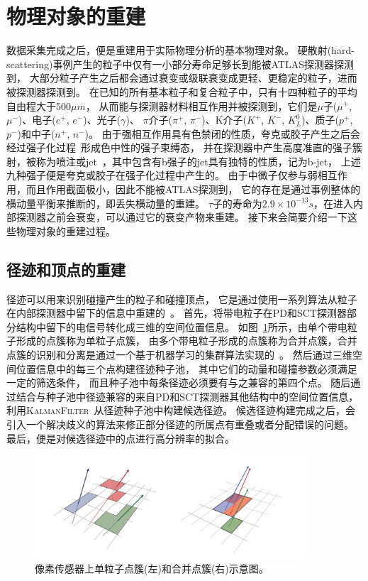 \section{物理对象的重建}
\label{sec:Reconstruction}

数据采集完成之后，便是重建用于实际物理分析的基本物理对象。
硬散射(hard-scattering)事例产生的粒子中仅有一小部分寿命足够长到能被ATLAS探测器探测到，
大部分粒子产生之后都会通过衰变或级联衰变成更轻、更稳定的粒子，进而被探测器探测到。
在已知的所有基本粒子和复合粒子中，只有十四种粒子的平均自由程大于500$\mu m$，
从而能与探测器材料相互作用并被探测到，它们是$\mu$子($\mu^+$, $\mu^-$)、电子($e^+$, $e^-$)、光子($\gamma$)、
$\pi$介子($\pi^+$, $\pi^-$)、K介子($K^+$, $K^-$, $K_L^0$)、质子($p^+$, $p^-$)和中子($n^+$, $n^-$)。
由于强相互作用具有色禁闭的性质，夸克或胶子产生之后会经过强子化过程~\cite{Hadonization}形成色中性的强子束缚态，
并在探测器中产生高度准直的强子簇射，被称为喷注或jet~\cite{JETS}，其中包含有b强子的jet具有独特的性质，记为b-jet，
上述九种强子便是夸克或胶子在强子化过程中产生的。
由于中微子仅参与弱相互作用，而且作用截面极小，因此不能被ATLAS探测到，
它的存在是通过事例整体的横动量平衡来推断的，即丢失横动量的重建。
$\tau$子的寿命为$2.9×10^{−13}s$，在进入内部探测器之前会衰变，可以通过它的衰变产物来重建。
接下来会简要介绍一下这些物理对象的重建过程。


\subsection{径迹和顶点的重建}
\label{sec:TRACKS}

径迹可以用来识别碰撞产生的粒子和碰撞顶点，
它是通过使用一系列算法从粒子在内部探测器中留下的信息中重建的~\cite{TRACK1}。
首先，将带电粒子在PD和SCT探测器部分结构中留下的电信号转化成三维的空间位置信息。
如图~\ref{fig:ATLASORT1}所示，由单个带电粒子形成的点簇称为单粒子点簇，
由多个带电粒子形成的点簇称为合并点簇，合并点簇的识别和分离是通过一个基于机器学习的集群算法实现的~\cite{NNCLUSTER}。
然后通过三维空间位置信息中的每三个点构建径迹种子池，
其中它们的动量和碰撞参数必须满足一定的筛选条件，
而且种子池中每条径迹必须要有与之兼容的第四个点。
随后通过结合与种子池中径迹兼容的来自PD和SCT探测器其他结构中的空间位置信息，
利用\textsc{KalmanFilter}~\cite{KALMAN}从径迹种子池中构建候选径迹。
候选径迹构建完成之后，会引入一个解决歧义的算法来修正部分径迹的所属点有重叠或者分配错误的问题。
最后，便是对候选径迹中的点进行高分辨率的拟合。

\begin{figure}
  \begin{center}
    \includegraphics[width=0.9\textwidth]{figuresEXP/ATLASORT1.jpg}
  \end{center}
  \caption{
像素传感器上单粒子点簇(左)和合并点簇(右)示意图。
  }
    \label{fig:ATLASORT1}
\end{figure}


